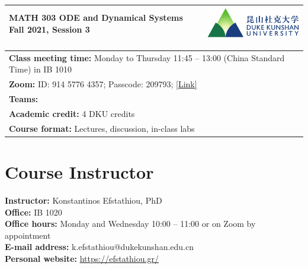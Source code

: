 \documentclass[11pt]{article}
\begin{document}

\begin{tabularx}{\textwidth}{Xm{6cm}}
\arrayrulecolor{dku-blue}\toprule\vspace{6pt}
{\bfseries\color{dku-blue}
 {\Large MATH 303} \newline\newline
 {\huge ODE and Dynamical Systems} \newline\newline
 {\Large Fall 2021, Session 3}} 
& \includegraphics[width=6cm]{dku-logo} \\
\bottomrule
\end{tabularx}

\vspace{1em}

\begin{tabularx}{\textwidth}{X}
\arrayrulecolor{dku-blue}\toprule
\textbf{Class meeting time:} Monday to Thursday 11:45 – 13:00 (China Standard Time) in IB 1010 \\
\textbf{Zoom:} ID: 914 5776 4357; Passcode: 209793; \href{https://duke.zoom.us/j/91457764357?pwd=cUJ3MndHajlVRzN6bWRkNlpwd2x5Zz09}{[Link]} \\
\textbf{Teams:} \\
\textbf{Academic credit:} 4 DKU credits \\
\textbf{Course format:} Lectures, discussion, in-class labs \\
\bottomrule
\end{tabularx}


\section{Course Instructor}

\textbf{Instructor:} Konstantinos Efstathiou, PhD \\
\textbf{Office:} IB 1020 \\
\textbf{Office hours:} Monday and Wednesday 10:00 – 11:00 or on Zoom by appointment \\
\textbf{E-mail address:} k.efstathiou@dukekunshan.edu.cn \\
\textbf{Personal website:} \url{https://efstathiou.gr/}
\end{document}
